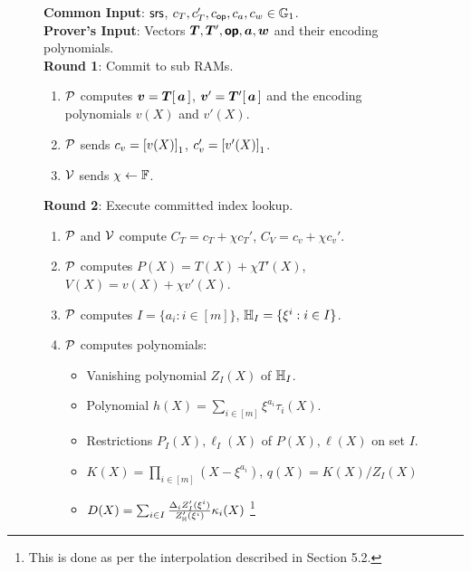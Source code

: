 \begin{figure}[t!]
\begin{mdframed}
        {\bf Common Input}: $\mathsf{srs}$, $c_T, c_T', c_{\mathsf{op}}, c_a, c_w\in \mathbb{G}_1$.\\
        {\bf Prover's Input}: Vectors $\vecT,\vecT',\vec{\op},\vec{a},\vec{w}$ and their encoding polynomials.\\

        {\bf Round 1}: Commit to sub RAMs.
        \begin{enumerate}[leftmargin=1em, label=\arabic*.]
            \item $\mathcal{P}$ computes $\vec{v}=\vecT[\,\vec{a}\,]$, $\vec{v}'=\vecT'[\,\vec{a}\,]$ and the encoding
            polynomials $v(X)$ and $v'(X)$.
            \item $\mathcal{P}$ sends $c_v = \left[{v(X)}\right]_1$, $c_v'=\left[{v'(X)}\right]_1$.
            \item $\mathcal{V}$ sends $\chi\gets \mathbb{F}$.
        \end{enumerate}

        {\bf Round 2}: Execute committed index lookup.
        \begin{enumerate}[leftmargin=1em, label=\arabic*.]
            \item $\mathcal{P}$ and $\mathcal{V}$ compute $C_T=c_T + \chi c_T'$, $C_V=c_v + \chi c_v'$.
            \item $\mathcal{P}$ computes $P(X) = T(X) + \chi T'(X)$, $V(X)=v(X) + \chi v'(X)$.
            \item $\mathcal{P}$ computes $I=\{a_i: i\in [m]\}$, $\mathbb{H}_I=\{\xi^i: i\in I\}$.
            \item $\mathcal{P}$ computes polynomials:
            \begin{itemize}[leftmargin=1em, label=-]
                \item Vanishing polynomial $Z_I(X)$ of $\mathbb{H}_I$.
                \item Polynomial $h(X)=\sum_{i\in [m]}\xi^{a_i}\tau_i(X)$.
                \item Restrictions $P_I(X),\ell_I(X)$ of $P(X),\ell(X)$ on set $I$.
                \item $K(X)=\prod_{i\in [m]}(X-\xi^{a_i})$, $q(X)=K(X)/Z_I(X)$
                \item $D(X)= \sum_{i\in I}\frac{\Delta_i Z_I'(\xi^i)}{Z_{\mathbb{H}}'(\xi^i)}\kappa_i(X)$ %
                		\footnote{This is done as per the interpolation described in Section 5.2.}
            \end{itemize}


\end{enumerate}
\end{mdframed}
\end{figure}
